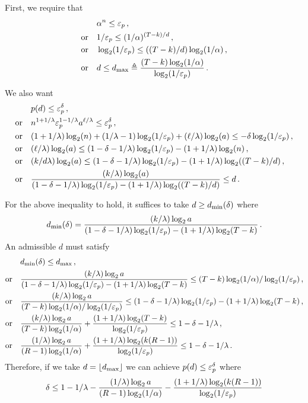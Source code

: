 	First, we require that 
	\begin{align*}
		&\alpha^n \leq \mathsf{\varepsilon}_p\,,\\
		\text{or}\quad &
			1/\mathsf{\varepsilon}_p \leq (1/\alpha)^{(T - k)/d}\,,\\
		\text{or}\quad &
			\log_2(1/\mathsf{\varepsilon}_p) \leq ((T - k)/d)\log_2(1/\alpha)\,,\\
		\text{or}\quad &
			d \leq d_\mathrm{max} \triangleq \frac{(T - k)\log_2(1/\alpha)}{\log_2(1/\mathsf{\varepsilon}_p)}
			\,.
	\end{align*}

	We also want 
	\begin{align*}
		&p(d) \leq \mathsf{\varepsilon}_p^{\delta}\,,\\
		\text{or}\quad &
			n^{1+1/\lambda} \mathsf{\varepsilon}_p^{1 - 1/\lambda} a^{\ell/\lambda} \leq \mathsf{\varepsilon}_p^\delta \,,\\
		\text{or}\quad &
			(1+1/\lambda)\log_2(n)
			+ (1/\lambda - 1)\log_2(1/\mathsf{\varepsilon}_p) 
			+ (\ell/\lambda) \log_2(a) \leq -\delta \log_2(1/\mathsf{\varepsilon}_p) \,,\\
		\text{or}\quad &			
			(\ell/\lambda) \log_2(a) \leq (1-\delta - 1/\lambda) \log_2(1/\mathsf{\varepsilon}_p) - (1+1/\lambda)\log_2(n)\,,\\
		\text{or}\quad &			
			(k/d\lambda) \log_2(a) \leq (1-\delta - 1/\lambda) \log_2(1/\mathsf{\varepsilon}_p) - (1+1/\lambda)\log_2((T-k)/d)\,,\\
		\text{or}\quad &			
			\frac{(k/\lambda) \log_2(a)}{(1-\delta - 1/\lambda) \log_2(1/\mathsf{\varepsilon}_p) - (1+1/\lambda)\log_2((T-k)/d)} \leq d
			\,.
	\end{align*}
	
	For the above inequality to hold, 
	it suffices to take $d \geq d_\mathrm{min}(\delta)$ where 
	$$
		d_\mathrm{min}(\delta) = \frac{(k/\lambda) \log_2 a}{(1 - \delta - 1/\lambda) \log_2(1/\mathsf{\varepsilon}_p) - (1+1/\lambda) \log_2(T - k)}
		\,.
	$$
	An admissible $d$ must satisfy
	\begin{align*}
		&d_\mathrm{min}(\delta) \leq d_\mathrm{max}	\,,\\
		\text{or}\quad &			
			\frac{(k/\lambda) \log_2 a}{(1 - \delta - 1/\lambda) \log_2(1/\mathsf{\varepsilon}_p) - (1+1/\lambda) \log_2(T - k)}
				\leq (T - k) \log_2(1/\alpha)/\log_2(1/\mathsf{\varepsilon}_p) \,,\\
		\text{or}\quad &			
			\frac{(k/\lambda) \log_2 a}{(T - k) \log_2(1/\alpha)/\log_2(1/\mathsf{\varepsilon}_p)} 
				\leq (1 - \delta - 1/\lambda) \log_2(1/\mathsf{\varepsilon}_p) - (1+1/\lambda) \log_2(T - k) \,,\\
		\text{or}\quad &			
			\frac{(k/\lambda) \log_2 a}{(T - k) \log_2(1/\alpha)} + \frac{(1+1/\lambda) \log_2(T - k)}{\log_2(1/\mathsf{\varepsilon}_p)}
				\leq 1 - \delta - 1/\lambda  \,,\\
		\text{or}\quad &			
			\frac{(1/\lambda) \log_2 a}{(R - 1) \log_2(1/\alpha)} + \frac{(1+1/\lambda) \log_2(k(R-1))}{\log_2(1/\mathsf{\varepsilon}_p)}
				\leq 1 - \delta - 1/\lambda  
				\,.
	\end{align*}
	Therefore, if we take $d = \lfloor d_\mathrm{max} \rfloor$ we can achieve  $p(d) \leq \mathsf{\varepsilon}_p^{\delta}$ 
	where 
	\begin{equation}\label{eq:delta}
		\delta
			\leq 1 - 1/\lambda - \frac{(1/\lambda) \log_2 a}{(R-1) \log_2(1/\alpha)} - \frac{(1+1/\lambda) \log_2(k(R-1))}{\log_2(1/\mathsf{\varepsilon}_p)}  
	\end{equation}

